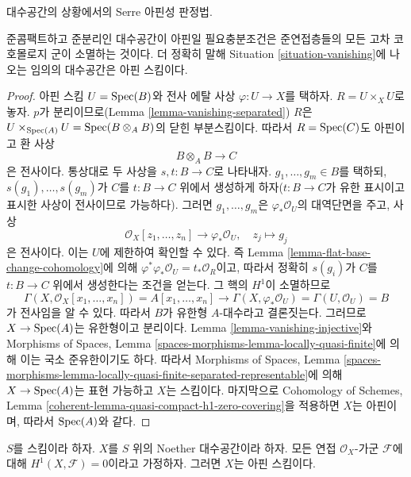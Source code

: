 \begin{proposition}
\label{proposition-vanishing-affine}
\begin{slogan}
대수공간의 상황에서의 Serre 아핀성 판정법.
\end{slogan}
준콤팩트하고 준분리인 대수공간이 아핀일 필요충분조건은 준연접층들의
모든 고차 코호몰로지 군이 소멸하는 것이다. 더 정확히 말해 Situation
\ref{situation-vanishing}에 나오는 임의의 대수공간은 아핀 스킴이다.
\end{proposition}

\begin{proof}
아핀 스킴 $U = \mathop{\mathrm{Spec}}(B)$와 전사 에탈 사상
$\varphi : U \to X$를 택하자. $R = U \times_X U$로 놓자.
$p$가 분리이므로(Lemma \ref{lemma-vanishing-separated}) $R$은
$U \times_{\mathop{\mathrm{Spec}}(A)} U = \mathop{\mathrm{Spec}}(B \otimes_A B)$의 닫힌 부분스킴이다.
따라서 $R = \mathop{\mathrm{Spec}}(C)$도 아핀이고 환 사상
$$
B \otimes_A B \longrightarrow C
$$
은 전사이다. 통상대로 두 사상을 $s, t : B \to C$로 나타내자.
$g_1, \ldots, g_m \in B$를 택하되, $s(g_1), \ldots, s(g_m)$가
$C$를 $t : B \to C$ 위에서 생성하게 하자($t : B \to C$가 유한 표시이고
표시한 사상이 전사이므로 가능하다). 그러면 $g_1, \ldots, g_m$은
$\varphi_*\mathcal{O}_U$의 대역단면을 주고, 사상
$$
\mathcal{O}_X[z_1, \ldots, z_n] \longrightarrow \varphi_*\mathcal{O}_U,
\quad
z_j \longmapsto g_j
$$
은 전사이다. 이는 $U$에 제한하여 확인할 수 있다. 즉 Lemma
\ref{lemma-flat-base-change-cohomology}에 의해
$\varphi^*\varphi_*\mathcal{O}_U = t_*\mathcal{O}_R$이고, 따라서 정확히
$s(g_i)$가 $C$를 $t : B \to C$ 위에서 생성한다는 조건을 얻는다.
그 핵의 $H^1$이 소멸하므로
$$
\Gamma(X, \mathcal{O}_X[x_1, \ldots, x_n]) =
A[x_1, \ldots, x_n] \longrightarrow
\Gamma(X, \varphi_*\mathcal{O}_U) = \Gamma(U, \mathcal{O}_U) = B
$$
가 전사임을 알 수 있다. 따라서 $B$가 유한형 $A$-대수라고 결론짓는다.
그러므로 $X \to \mathop{\mathrm{Spec}}(A)$는 유한형이고 분리이다. Lemma
\ref{lemma-vanishing-injective}와 Morphisms of Spaces, Lemma
\ref{spaces-morphisms-lemma-locally-quasi-finite}에 의해 이는 국소
준유한이기도 하다. 따라서 Morphisms of Spaces, Lemma
\ref{spaces-morphisms-lemma-locally-quasi-finite-separated-representable}에
의해 $X \to \mathop{\mathrm{Spec}}(A)$는 표현 가능하고 $X$는 스킴이다. 마지막으로
Cohomology of Schemes, Lemma
\ref{coherent-lemma-quasi-compact-h1-zero-covering}을 적용하면 $X$는
아핀이며, 따라서 $\mathop{\mathrm{Spec}}(A)$와 같다.
\end{proof}

\begin{lemma}
\label{lemma-Noetherian-h1-zero}
$S$를 스킴이라 하자. $X$를 $S$ 위의 Noether 대수공간이라 하자.
모든 연접 $\mathcal{O}_X$-가군 $\mathcal{F}$에 대해
$H^1(X, \mathcal{F}) = 0$이라고 가정하자. 그러면 $X$는 아핀 스킴이다.
\end{lemma}

